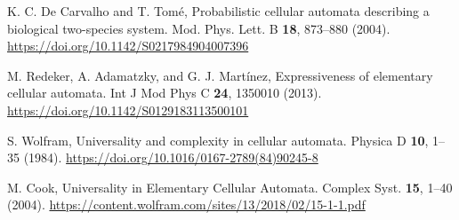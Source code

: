 \begin{thebibliography}{04}
\raggedright
K. C. De Carvalho and T. Tomé,
Probabilistic cellular automata describing a biological two-species system.
Mod. Phys. Lett. B \textbf{18}, 873--880 (2004).
\url{https://doi.org/10.1142/S0217984904007396}

\raggedright
M. Redeker, A. Adamatzky, and G. J. Martínez,
Expressiveness of elementary cellular automata.
Int J Mod Phys C \textbf{24}, 1350010 (2013).
\url{https://doi.org/10.1142/S0129183113500101}



\raggedright
S. Wolfram,
Universality and complexity in cellular automata.
Physica D \textbf{10}, 1--35 (1984).
\url{https://doi.org/10.1016/0167-2789(84)90245-8}

\raggedright
M. Cook,
Universality in Elementary Cellular Automata.
Complex Syst. \textbf{15}, 1--40 (2004). 
\url{https://content.wolfram.com/sites/13/2018/02/15-1-1.pdf}
\end{thebibliography}


